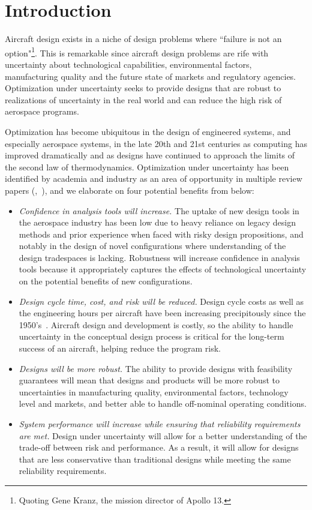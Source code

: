 \section{Introduction}

Aircraft design exists in a niche of design problems where ``failure is
not an option"\footnote{Quoting Gene Kranz, the mission director of Apollo 13.}.
This is remarkable since aircraft design problems are rife with uncertainty about
technological capabilities, environmental factors, manufacturing quality and the future
state of markets and regulatory agencies.
Optimization under uncertainty seeks to provide designs that are robust
to realizations of uncertainty in the real world and can reduce
the high risk of aerospace programs.

Optimization has become ubiquitous in the design of engineered systems, and especially aerospace systems,
in the late 20th and 21st centuries as computing has improved dramatically and as designs have
continued to approach the limits of the second law of thermodynamics. Optimization under uncertainty
has been identified by academia and industry as an area of opportunity
in multiple review papers (\cite{Zang2002},~\cite{Yao2011}),
and we elaborate on four potential benefits from \cite{Zang2002} below:
\begin{itemize}
    \item \emph{Confidence in analysis tools will increase.}
    The uptake of new design tools in the aerospace industry has been low
    due to heavy reliance on legacy design methods and prior experience when
    faced with risky design propositions, and notably in
    the design of novel configurations where understanding
    of the design tradespaces is lacking. Robustness will increase
    confidence in analysis tools because it appropriately captures the
    effects of technological uncertainty on the potential benefits of new
    configurations.
    \item \emph{Design cycle time, cost, and risk will be reduced.}
    Design cycle costs as well as the engineering hours per aircraft have been increasing
    precipitously since the 1950's~\cite{Patt2012}.
    Aircraft design and development is costly, so the ability to handle uncertainty in
    the conceptual design process is critical for the long-term success of an aircraft,
    helping reduce the program risk.
    \item \emph{Designs will be more robust.}
    The ability to provide designs with feasibility guarantees will mean
    that designs and products will be more robust to uncertainties in manufacturing quality,
    environmental factors, technology level and markets, and better able to
    handle off-nominal operating conditions.
    \item \emph{System performance will increase while ensuring that reliability requirements
    are met.}
    Design under uncertainty will allow for a better understanding of the trade-off between risk and
    performance. As a result, it will allow for designs that are less conservative than
    traditional designs while meeting the same reliability requirements.
\end{itemize}

